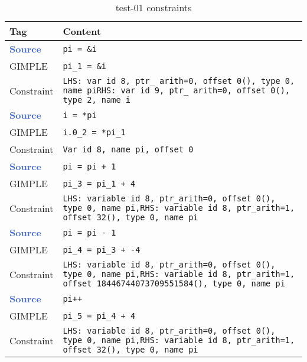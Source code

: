     \begin{center}
        \begin{longtable}{| m{10ex} | m{75ex} |}

\caption{test-01 constraints\label{table:test-01-constr}} \\
            \hline
            \textbf{Tag} & \textbf{Content} \\
            \hline
            \hline
            \textcolor{RoyalBlue}{\textbf{Source}} & \texttt{pi = \&i} \\ \hline
            GIMPLE & \texttt{pi\_1 = \&i} \\ \hline
            Constraint & \texttt{LHS: var id 8, ptr\_ arith=0, offset 0(), type 0, name pi\newline RHS: var id 9, ptr\_ arith=0, offset 0(), type 2, name i} \\
            \hline 
            \hline
            \textcolor{RoyalBlue}{\textbf{Source}} & \texttt{i = *pi} \\ \hline
            GIMPLE & \texttt{i.0\_2 = *pi\_1} \\ \hline
            Constraint & \texttt{Var id 8, name pi, offset 0} \\
            \hline
            \hline
            \textcolor{RoyalBlue}{\textbf{Source}} & \texttt{pi = pi + 1} \\ \hline
            GIMPLE & \texttt{pi\_3 = pi\_1 + 4} \\ \hline
            Constraint & \texttt{LHS: variable id 8, ptr\_arith=0, offset 0(), type 0, name pi,\newline RHS: variable id 8, ptr\_arith=1, offset 32(), type 0, name pi} \\
            \hline
            \hline
            \textcolor{RoyalBlue}{\textbf{Source}} & \texttt{pi = pi - 1} \\ \hline
            GIMPLE & \texttt{pi\_4 = pi\_3 + -4} \\ \hline
            Constraint & \texttt{LHS: variable id 8, ptr\_arith=0, offset 0(), type 0, name pi,\newline RHS: variable id 8, ptr\_arith=1, offset 18446744073709551584(), type 0, name pi} \\
            \hline
            \hline
            \textcolor{RoyalBlue}{\textbf{Source}} & \texttt{pi++} \\ \hline
            GIMPLE & \texttt{pi\_5 = pi\_4 + 4} \\ \hline
            Constraint & \texttt{LHS: variable id 8, ptr\_arith=0, offset 0(), type 0, name pi,\newline RHS: variable id 8, ptr\_arith=1, offset 32(), type 0, name pi} \\

\end{longtable}
\end{center}
